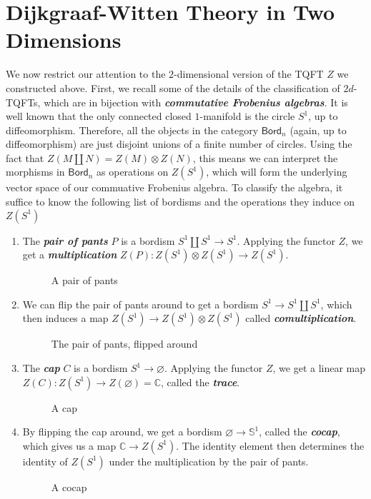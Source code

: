 \documentclass[psamsfonts, 11pt]{amsart}
\newcommand{\incfig}[2]{%
    \def\svgwidth{\columnwidth}
    \scalebox{#2}{}
}
\theoremstyle{definition}
\theoremstyle{remark}
\newcommand{\Bord}{\mathsf{Bord}}
\renewcommand{\emptyset}{\varnothing}
\newcommand{\ib}[1]{\textbf{\textit{#1}}}
\newcommand{\C}{\mathbb{C}}
\renewcommand{\S}{\mathbb{S}}
\begin{document}
\section{Dijkgraaf-Witten Theory in Two Dimensions}
%
We now restrict our attention to the $2$-dimensional version of the TQFT $Z$
we constructed above. First, we recall some of the details of the classification of
$2d$-TQFTs, which are in bijection with \ib{commutative Frobenius algebras}. It is well
known that the only connected closed $1$-manifold is the circle $S^1$, up to
diffeomorphism. Therefore, all the objects in the category $\Bord_n$ (again, up to
diffeomorphism) are just disjoint unions of a finite number of circles. Using the fact
that $Z(M \coprod N) = Z(M) \otimes Z(N)$, this means we can interpret the morphisms
in $\Bord_n$ as operations on $Z(S^1)$, which will form the underlying vector space
of our commuative Frobenius algebra. To classify the algebra, it suffice to know the
following list of bordisms and the operations they induce on $Z(S^1)$
\begin{enumerate}
  \item The \ib{pair of pants} $P$ is a bordism $S^1 \coprod S^1 \to S^1$. Applying
  the functor $Z$, we get a \ib{multiplication}
  $Z(P) : Z(S^1) \otimes Z(S^1) \to Z(S^1)$.
  \begin{figure}[ht]
      \centering
      \incfig{pair_of_pants}{0.15}
      \caption{A pair of pants}
  \end{figure}
  \item We can flip the pair of pants around to get a bordism $S^1 \to S^1 \coprod S^1$,
  which then induces a map $Z(S^1) \to Z(S^1) \otimes Z(S^1)$ called
  \ib{comultiplication}.
  \begin{figure}[ht]
      \centering
      \incfig{flipped_pair_of_pants}{0.15}
      \caption{The pair of pants, flipped around}
  \end{figure}
  \item The \ib{cap} $C$ is a bordism $S^1 \to \emptyset$. Applying the functor $Z$, we
  get a linear map $Z(C) : Z(S^1) \to Z(\emptyset) = \C$, called the \ib{trace}.
  \begin{figure}[ht]
      \centering
      \incfig{cap}{0.15}
      \caption{A cap}
  \end{figure}
  \item By flipping the cap around, we get a bordism $\emptyset \to \S^1$, called
  the \ib{cocap}, which gives us a map $\C \to Z(S^1)$. The identity element then
  determines the identity of $Z(S^1)$ under the multiplication by the pair of pants.
  \begin{figure}[ht]
      \centering
      \incfig{cocap}{0.15}
      \caption{A cocap}
  \end{figure}
\end{enumerate}
\end{document}
